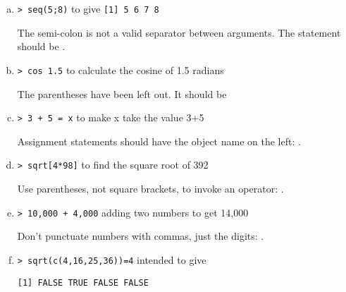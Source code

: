 \begin{enumerate}[(a)]
\item \verb|> seq(5;8)|  to give \verb|[1] 5 6 7 8|
\TextEntry

\begin{AnswerText}
The semi-colon is not a valid separator between arguments.  The statement should be .
\end{AnswerText}

\item \verb|> cos 1.5| to calculate the cosine of 1.5 radians

\TextEntry

\begin{AnswerText}
The parentheses have been left out.  It should be 
\end{AnswerText}


\item \verb|> 3 + 5 = x| to  make x take the value 3+5

\TextEntry

\begin{AnswerText}
Assignment statements should have the object name on the left: .
\end{AnswerText}


\item \verb|> sqrt[4*98]| to find the square root of 392

\TextEntry

\begin{AnswerText}
Use parentheses, not square brackets, to invoke an operator: .

\end{AnswerText}


\item \verb|> 10,000 + 4,000| adding two numbers to get 14,000

\TextEntry

\begin{AnswerText}
Don't punctuate numbers with commas, just the digits: .
\end{AnswerText}


\item \verb|> sqrt(c(4,16,25,36))=4| intended to give 
\begin{verbatim}[1] FALSE TRUE FALSE FALSE
\end{verbatim}


\end{enumerate}
